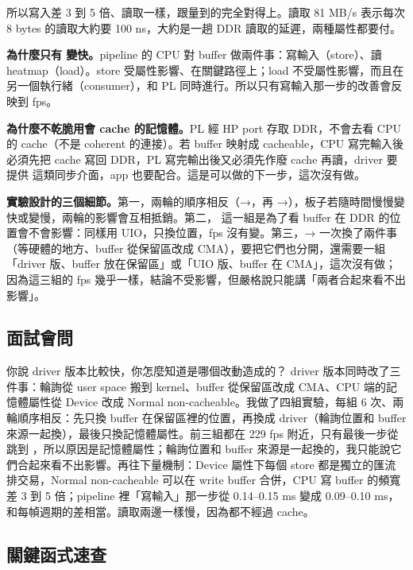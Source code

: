 所以寫入差 3 到 5 倍、讀取一樣，跟量到的完全對得上。讀取 81 MB/s 表示每次 8 bytes 的讀取大約要 100 ns，大約是一趟 DDR 讀取的延遲，兩種屬性都要付。

\textbf{為什麼只有  變快。}pipeline 的 CPU 對 buffer 做兩件事：寫輸入（store）、讀 heatmap（load）。store 受屬性影響、在關鍵路徑上；load 不受屬性影響，而且在另一個執行緒（consumer），和 PL 同時進行。所以只有寫輸入那一步的改善會反映到 fps。

\textbf{為什麼不乾脆用會 cache 的記憶體。}PL 經 HP port 存取 DDR，不會去看 CPU 的 cache（不是 coherent 的連接）。若 buffer 映射成 cacheable，CPU 寫完輸入後必須先把 cache 寫回 DDR，PL 寫完輸出後又必須先作廢 cache 再讀，driver 要提供  這類同步介面，app 也要配合。這是可以做的下一步，這次沒有做。

\textbf{實驗設計的三個細節。}第一，兩輪的順序相反（→，再 →），板子若隨時間慢慢變快或變慢，兩輪的影響會互相抵銷。第二， 這一組是為了看 buffer 在 DDR 的位置會不會影響：同樣用 UIO，只換位置，fps 沒有變。第三，→ 一次換了兩件事（等硬體的地方、buffer 從保留區改成 CMA），要把它們也分開，還需要一組「driver 版、buffer 放在保留區」或「UIO 版、buffer 在 CMA」，這次沒有做；因為這三組的 fps 幾乎一樣，結論不受影響，但嚴格說只能講「兩者合起來看不出影響」。

\subsection{面試會問}

\begin{qa}{你說 driver 版本比較快，你怎麼知道是哪個改動造成的？}
driver 版本同時改了三件事：輪詢從 user space 搬到 kernel、buffer 從保留區改成 CMA、CPU 端的記憶體屬性從 Device 改成 Normal non-cacheable。我做了四組實驗，每組 6 次、兩輪順序相反：先只換 buffer 在保留區裡的位置，再換成 driver（輪詢位置和 buffer 來源一起換），最後只換記憶體屬性。前三組都在 229 fps 附近，只有最後一步從 \abDrvDev{} 跳到 \abDrvNc{}，所以原因是記憶體屬性；輪詢位置和 buffer 來源是一起換的，我只能說它們合起來看不出影響。再往下量機制：Device 屬性下每個 store 都是獨立的匯流排交易，Normal non-cacheable 可以在 write buffer 合併，CPU 寫 buffer 的頻寬差 3 到 5 倍；pipeline 裡「寫輸入」那一步從 0.14--0.15 ms 變成 0.09--0.10 ms，和每幀週期的差相當。讀取兩邊一樣慢，因為都不經過 cache。
\end{qa}

\subsection{關鍵函式速查}


